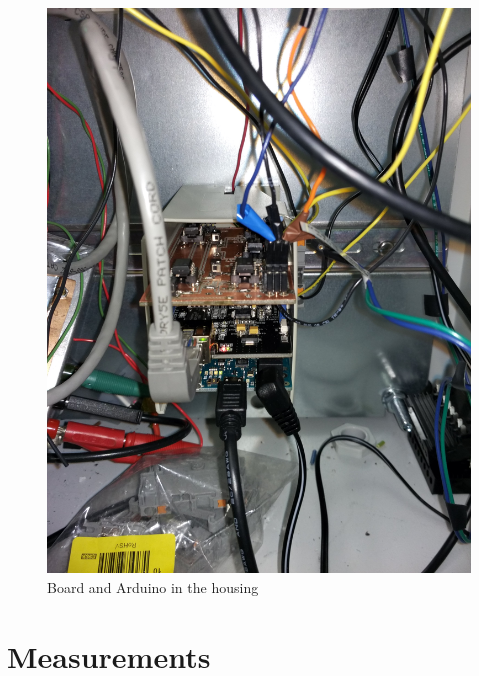 \documentclass[12pt]{scrartcl}
\begin{document}
      \begin{figure}[H]
        \includegraphics[width = \textwidth]{imschrank.jpg}
        \caption{Board and Arduino in the housing}
        \label{fig7}
      \end{figure}
    \section{Measurements}
\end{document}
